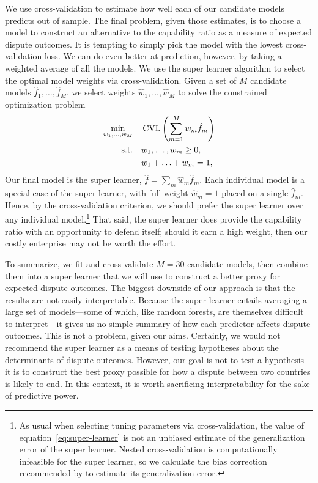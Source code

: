 We use cross-validation to estimate how well each of our candidate models predicts out of sample.
The final problem, given those estimates, is to choose a model to construct an alternative to the capability ratio as a measure of expected dispute outcomes.
It is tempting to simply pick the model with the lowest cross-validation loss.
We can do even better at prediction, however, by taking a weighted average of all the models.
We use the super learner algorithm \citep{vanderLaan:bz} to select the optimal model weights via cross-validation.
Given a set of $M$ candidate models $\hat{f}_1, \ldots, \hat{f}_M$, we select weights $\hat{w}_1, \ldots, \hat{w}_M$ to solve the constrained optimization problem
\begin{equation}
  \label{eq:super-learner}
  \begin{aligned}
    \min_{w_1, \ldots, w_M}
    &\quad
    \operatorname{CVL} \left(
      \sum_{m=1}^M w_m \hat{f}_m
    \right)
    \\
    \mbox{s.t.}
    &\quad
    w_1, \ldots, w_m \geq 0,
    \\
    &\quad
    w_1 + \ldots + w_m = 1,
  \end{aligned}
\end{equation}
Our final model is the super learner, $\hat{f} = \sum_m \hat{w}_m \hat{f}_m$.
Each individual model is a special case of the super learner, with full weight $\hat{w}_m = 1$ placed on a single $\hat{f}_m$.
Hence, by the cross-validation criterion, we should prefer the super learner over any individual model.\footnote{%
  \label{fn:sl-bias}
  As usual when selecting tuning parameters via cross-validation, the value of equation~\eqref{eq:super-learner} is not an unbiased estimate of the generalization error of the super learner.
  Nested cross-validation is computationally infeasible for the super learner, so we calculate the bias correction recommended by \citet{Tibshirani:2009tz} to estimate its generalization error.
}  That said, the super learner does provide the capability ratio with an opportunity to defend itself; should it earn a high weight, then our costly enterprise may not be worth the effort.

To summarize, we fit and cross-validate $M = 30$ candidate models, then combine them into a super learner that we will use to construct a better proxy for expected dispute outcomes.
The biggest downside of our approach is that the results are not easily interpretable.
Because the super learner entails averaging a large set of models---some of which, like random forests, are themselves difficult to interpret---it gives us no simple summary of how each predictor affects dispute outcomes.
This is not a problem, given our aims.
Certainly, we would not recommend the super learner as a means of testing hypotheses about the determinants of dispute outcomes.
However, our goal is not to test a hypothesis---it is to construct the best proxy possible for how a dispute between two countries is likely to end.
In this context, it is worth sacrificing interpretability for the sake of predictive power.

